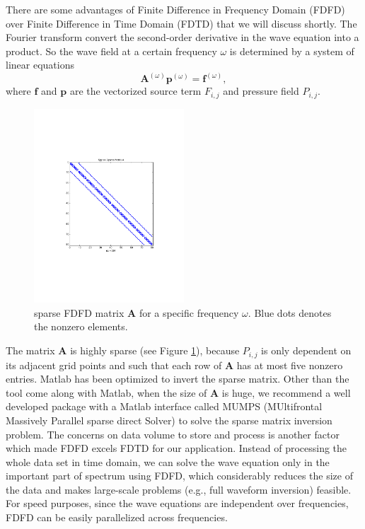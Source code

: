\documentclass[11pt]{article}
\newcommand{\bA}{\boldsymbol{A}}
\newcommand{\bff}{\boldsymbol{f}}
\newcommand{\bp}{\boldsymbol{p}}
\theoremstyle{plain}
\theoremstyle{definition}
\theoremstyle{remark}
\numberwithin{equation}{section}
\begin{document}
There are some advantages of Finite Difference in Frequency Domain (FDFD) over Finite Difference in Time Domain (FDTD) that we will discuss shortly. The Fourier transform convert the second-order derivative in the wave equation into a product. So the wave field at a certain frequency $\omega$ is determined by a system of linear equations 
\begin{equation}\label{eq:awFreq}
\bA^{(\omega)}\bp^{(\omega)} = \bff^{(\omega)},
\end{equation}
where $\bff$ and $\bp$ are the vectorized source term $F_{i,j}$ and pressure field $P_{i,j}$.
 \begin{figure}[htbp]
\centering
\includegraphics[width=0.5\textwidth]{Fig/FDFDMatrixA.pdf}
\caption{sparse FDFD matrix $\bA$ for a specific frequency $\omega$. Blue dots denotes the nonzero elements.}
\label{fig:SparseA}
\end{figure}

The matrix $\bA$ is highly sparse (see Figure \ref{fig:SparseA}), because $P_{i,j}$ is only dependent on its adjacent grid points and such that each row of $\bA$ has at most five nonzero entries.
  Matlab has been optimized to invert the sparse matrix. Other than the tool come along with Matlab, when the size of $\bA$ is huge, we recommend a well developed package with a Matlab interface called MUMPS (MUltifrontal Massively Parallel sparse direct Solver) to solve the sparse matrix inversion problem. 
 The concerns on data volume to store and process is another factor which made FDFD excels FDTD for our application. Instead of processing the whole data set in time domain, we can solve the wave equation only in the important part of spectrum using FDFD, which considerably reduces the size of the data and makes large-scale problems (e.g., full waveform inversion) feasible. For speed purposes, since the wave equations are independent over frequencies, FDFD can be easily parallelized across frequencies.
\end{document}
